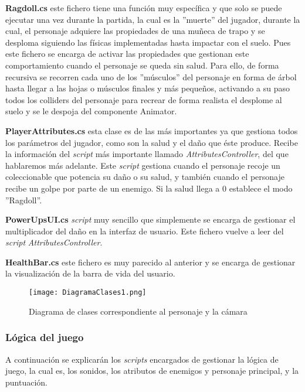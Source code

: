 \textbf{Ragdoll.cs} este fichero tiene una función muy específica y que solo se puede ejecutar una vez durante la partida, la cual es la ''muerte'' del jugador, durante la cual, el personaje adquiere las propiedades de una muñeca de trapo y se desploma siguiendo las físicas implementadas hasta impactar con el suelo. Pues este fichero se encarga de activar las propiedades que gestionan este comportamiento cuando el personaje se queda sin salud. Para ello, de forma recursiva se recorren cada uno de los ''músculos'' del personaje en forma de árbol hasta llegar a las hojas o músculos finales y más pequeños, activando a su paso todos los colliders del personaje para recrear de forma realista el desplome al suelo y se le despoja del componente Animator.

\textbf{PlayerAttributes.cs} esta clase es de las más importantes ya que gestiona todos los parámetros del jugador, como son la salud y el daño que éste produce. Recibe la información del \textit{script} más importante llamado \textit{AttributesController}, del que hablaremos más adelante. Este \textit{script} gestiona cuando el personaje recoje un coleccionable que potencia su daño o su salud, y también cuando el personaje recibe un golpe por parte de un enemigo. Si la salud llega a 0 establece el modo ''Ragdoll''.

\textbf{PowerUpsUI.cs} \textit{script} muy sencillo que simplemente se encarga de gestionar el multiplicador del daño en la interfaz de usuario. Este fichero vuelve a leer del \textit{script} \textit{AttributesController}.

\textbf{HealthBar.cs} este fichero es muy parecido al anterior y se encarga de gestionar la visualización de la barra de vida del usuario. 

\begin{figure}[H]
    \centering
    \texttt{[image: DiagramaClases1.png]}
    \caption{Diagrama de clases correspondiente al personaje y la cámara}
\end{figure}

\subsubsection{Lógica del juego}

A continuación se explicarán los \textit{scripts} encargados de gestionar la lógica de juego, la cual es, los sonidos, los atributos de enemigos y personaje principal, y la puntuación.

